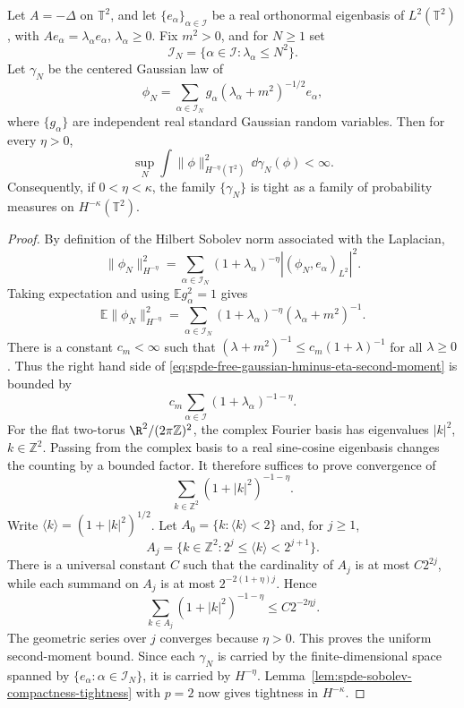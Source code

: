 \begin{proposition}
\label{prop:spde-free-gaussian-negative-sobolev-tightness}
Let \(A=-\Delta\) on \(\mathbb T^2\), and let
\(\{e_\alpha\}_{\alpha\in\mathcal I}\) be a real orthonormal eigenbasis of
\(L^2(\mathbb T^2)\), with \(Ae_\alpha=\lambda_\alpha e_\alpha\),
\(\lambda_\alpha\geq0\).  Fix \(m^2>0\), and for \(N\geq1\) set
\[
  \mathcal I_N=\{\alpha\in\mathcal I:\lambda_\alpha\leq N^2\}.
\]
Let \(\gamma_N\) be the centered Gaussian law of
\[
  \phi_N
  =
  \sum_{\alpha\in\mathcal I_N}
  g_\alpha(\lambda_\alpha+m^2)^{-1/2}e_\alpha ,
\]
where \(\{g_\alpha\}\) are independent real standard Gaussian random
variables.  Then for every \(\eta>0\),
\[
  \sup_N
  \int
  \|\phi\|_{H^{-\eta}(\mathbb T^2)}^2\,\dd\gamma_N(\phi)
  <\infty .
\]
Consequently, if \(0<\eta<\kappa\), the family \(\{\gamma_N\}\) is tight as
a family of probability measures on \(H^{-\kappa}(\mathbb T^2)\).
\end{proposition}

\begin{proof}
By definition of the Hilbert Sobolev norm associated with the Laplacian,
\[
  \|\phi_N\|_{H^{-\eta}}^2
  =
  \sum_{\alpha\in\mathcal I_N}
  (1+\lambda_\alpha)^{-\eta}
  |(\phi_N,e_\alpha)_{L^2}|^2 .
\]
Taking expectation and using \(\mathbb E g_\alpha^2=1\) gives
\begin{equation}
  \mathbb E\|\phi_N\|_{H^{-\eta}}^2
  =
  \sum_{\alpha\in\mathcal I_N}
  (1+\lambda_\alpha)^{-\eta}
  (\lambda_\alpha+m^2)^{-1}.
  \label{eq:spde-free-gaussian-hminus-eta-second-moment}
\end{equation}
There is a constant \(c_m<\infty\) such that
\((\lambda+m^2)^{-1}\leq c_m(1+\lambda)^{-1}\) for all \(\lambda\geq0\).
Thus the right hand side of
\eqref{eq:spde-free-gaussian-hminus-eta-second-moment} is bounded by
\[
  c_m
  \sum_{\alpha\in\mathcal I}
  (1+\lambda_\alpha)^{-1-\eta}.
\]
For the flat two-torus \(\R^2/(2\pi\mathbb Z)^2\), the complex Fourier basis
has eigenvalues \(|k|^2\), \(k\in\mathbb Z^2\).  Passing from the complex
basis to a real sine-cosine eigenbasis changes the counting by a bounded
factor.  It therefore suffices to prove convergence of
\[
  \sum_{k\in\mathbb Z^2}(1+|k|^2)^{-1-\eta}.
\]
Write \(\langle k\rangle=(1+|k|^2)^{1/2}\).
Let \(A_0=\{k:\langle k\rangle<2\}\) and, for \(j\geq1\),
\[
  A_j=\{k\in\mathbb Z^2:2^j\leq \langle k\rangle<2^{j+1}\}.
\]
There is a universal constant \(C\) such that the cardinality of \(A_j\) is
at most \(C2^{2j}\), while each summand on \(A_j\) is at most
\(2^{-2(1+\eta)j}\).  Hence
\[
  \sum_{k\in A_j}(1+|k|^2)^{-1-\eta}
  \leq
  C2^{-2\eta j}.
\]
The geometric series over \(j\) converges because \(\eta>0\).  This proves
the uniform second-moment bound.  Since each \(\gamma_N\) is carried by the
finite-dimensional space spanned by \(\{e_\alpha:\alpha\in\mathcal I_N\}\),
it is carried by \(H^{-\eta}\).
Lemma~\ref{lem:spde-sobolev-compactness-tightness} with \(p=2\) now
gives tightness in \(H^{-\kappa}\).
\end{proof}

